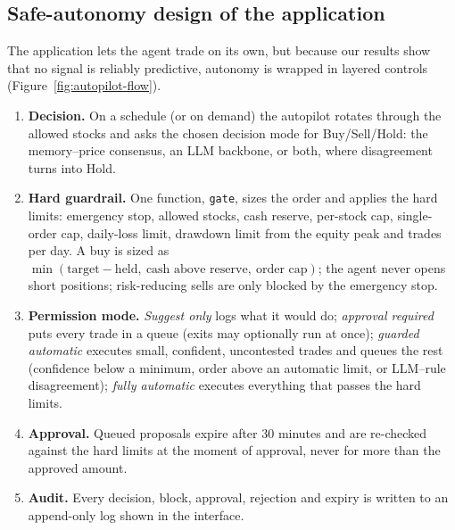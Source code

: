 \subsection{Safe-autonomy design of the application}
\label{sec:autopilot-design}
The application lets the agent trade on its own, but because our results show that no signal is reliably predictive, autonomy is wrapped in layered controls (Figure~\ref{fig:autopilot-flow}).
\begin{enumerate}
  \item \textbf{Decision.} On a schedule (or on demand) the autopilot rotates through the allowed stocks and asks the chosen decision mode for Buy/Sell/Hold: the memory--price consensus, an LLM backbone, or both, where disagreement turns into Hold.
  \item \textbf{Hard guardrail.} One function, \texttt{gate}, sizes the order and applies the hard limits: emergency stop, allowed stocks, cash reserve, per-stock cap, single-order cap, daily-loss limit, drawdown limit from the equity peak and trades per day. A buy is sized as $\min(\text{target}-\text{held},\ \text{cash above reserve},\ \text{order cap})$; the agent never opens short positions; risk-reducing sells are only blocked by the emergency stop.
  \item \textbf{Permission mode.} \emph{Suggest only} logs what it would do; \emph{approval required} puts every trade in a queue (exits may optionally run at once); \emph{guarded automatic} executes small, confident, uncontested trades and queues the rest (confidence below a minimum, order above an automatic limit, or LLM--rule disagreement); \emph{fully automatic} executes everything that passes the hard limits.
  \item \textbf{Approval.} Queued proposals expire after 30 minutes and are re-checked against the hard limits at the moment of approval, never for more than the approved amount.
  \item \textbf{Audit.} Every decision, block, approval, rejection and expiry is written to an append-only log shown in the interface.
\end{enumerate}

